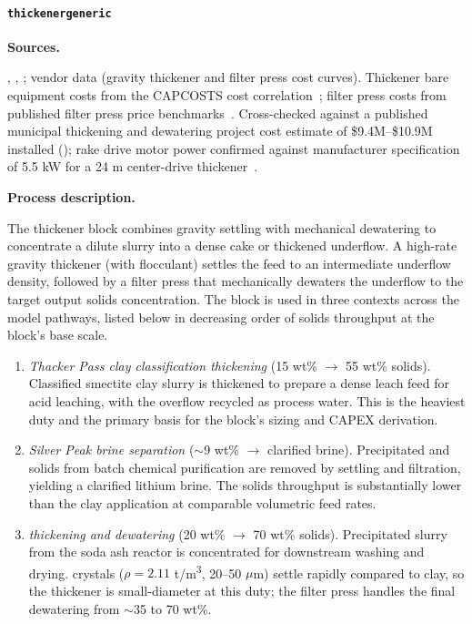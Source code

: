 \documentclass{article}
\renewcommand\_{\textunderscore\allowbreak}
\begin{document}
\clearpage
\paragraph{\texttt{thickener\_generic}}\label{app:04-methods-blockdefs-thickener}\leavevmode\par

\medskip
\noindent\textbf{Sources.}\quad

\citet{sgscanadaincSK1300Technical2024}, \citet{petersPlantDesignEconomics1991}, \citet{mularCAPCOSTSHandbookEstimating1998}; vendor data (gravity thickener and filter press cost curves). Thickener bare equipment costs from the CAPCOSTS cost correlation~\citep{mularCAPCOSTSHandbookEstimating1998}; filter press costs from published filter press price benchmarks~\citep{porvooIndustrialFilterPress2025}. Cross-checked against a published municipal thickening and dewatering project cost estimate of \$9.4M--\$10.9M installed (\citet{cleargovCostEstimateDraft}); rake drive motor power confirmed against manufacturer specification of 5.5 kW for a 24 m center-drive thickener~\cite{jinhaominingHotItemLarge}. 


\medskip
\noindent\textbf{Process description.}\quad

The thickener block combines gravity settling with mechanical dewatering to concentrate a dilute slurry into a dense cake or thickened underflow. A high-rate gravity thickener (with flocculant) settles the feed to an intermediate underflow density, followed by a filter press that mechanically dewaters the underflow to the target output solids concentration. The block is used in three contexts across the model pathways, listed below in decreasing order of solids throughput at the block's base scale. 

\begin{enumerate}[noitemsep]
	\item \textit{Thacker Pass clay classification thickening} (15 wt\% $\rightarrow$ 55 wt\% solids). Classified smectite clay slurry is thickened to prepare a dense leach feed for acid leaching, with the overflow recycled as process water. This is the heaviest duty and the primary basis for the block's sizing and CAPEX derivation.
	\item \textit{Silver Peak brine separation} ($\sim$9 wt\% $\rightarrow$ clarified brine). Precipitated  and  solids from batch chemical purification are removed by settling and filtration, yielding a clarified lithium brine. The solids throughput is substantially lower than the clay application at comparable volumetric feed rates.
	\item \textit{ thickening and dewatering} (20 wt\% $\rightarrow$ 70 wt\% solids). Precipitated  slurry from the soda ash reactor is concentrated for downstream washing and drying.  crystals ($\rho = 2.11$ \si{t/m^3}, 20--50 $\mu$m) settle rapidly compared to clay, so the thickener is small-diameter at this duty; the filter press handles the final dewatering from $\sim$35 to 70 wt\%.
\end{enumerate}
 
\end{document}
